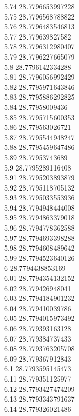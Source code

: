 {5.74	28.7796653997228\\
5.75	28.7796568788822\\
5.76	28.7796483546813\\
5.77	28.779639827582\\
5.78	28.7796312980407\\
5.79	28.7796227665079\\
5.8	28.7796142334288\\
5.81	28.7796056992429\\
5.82	28.7795971643846\\
5.83	28.7795886292825\\
5.84	28.77958009436\\
5.85	28.7795715600353\\
5.86	28.779563026721\\
5.87	28.7795544948247\\
5.88	28.7795459647486\\
5.89	28.77953743689\\
5.9	28.7795289116408\\
5.91	28.7795203893879\\
5.92	28.7795118705132\\
5.93	28.7795033553936\\
5.94	28.7794948444008\\
5.95	28.7794863379018\\
5.96	28.7794778362588\\
5.97	28.7794693398288\\
5.98	28.7794608489642\\
5.99	28.7794523640126\\
6	28.7794438853169\\
6.01	28.7794354132152\\
6.02	28.779426948041\\
6.03	28.7794184901232\\
6.04	28.779410039786\\
6.05	28.7794015973492\\
6.06	28.779393163128\\
6.07	28.779384737433\\
6.08	28.7793763205708\\
6.09	28.779367912843\\
6.1	28.7793595145473\\
6.11	28.779351125977\\
6.12	28.7793427474209\\
6.13	28.7793343791637\\
6.14	28.779326021486\\
}
